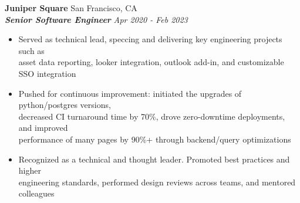 \documentclass[]{resume}
\newcommand\tab[1][.5cm]{\hspace*{#1}}
\begin{document}
\begin{resume}
\vspace{0.9mm}
\textbf{\large Juniper Square} {\large San Francisco, CA}\\
\tab \textbf{\textit{Senior Software Engineer}} \hfill \textit{Apr 2020 - Feb 2023}
\begin{itemize}
    \item
    Served as technical lead, speccing and delivering key engineering projects such as \\
    asset data reporting, looker integration, outlook add-in, and customizable SSO integration
    \item
    Pushed for continuous improvement: initiated the upgrades of python/postgres versions,\\
     decreased CI turnaround time by 70\%, drove zero-downtime deployments, and improved \\
     performance of many pages by 90\%+ through backend/query optimizations
    \item
    Recognized as a technical and thought leader. Promoted best practices and higher \\
    engineering standards, performed design reviews across teams, and mentored colleagues
\end{itemize}


\end{resume}
\end{document}
